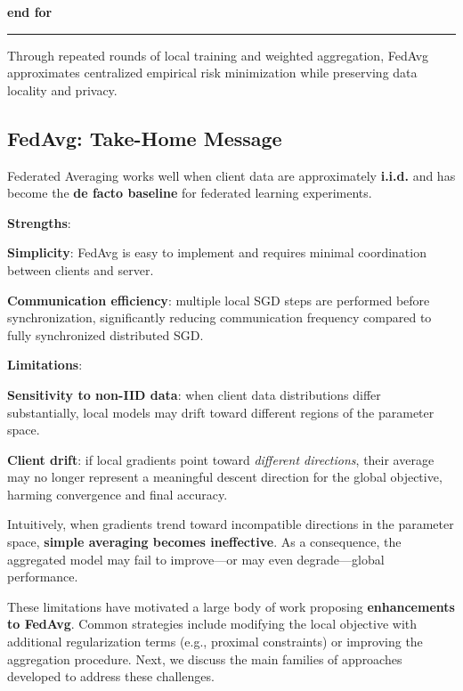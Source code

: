 \noindent\textbf{end for}

\noindent\rule{\textwidth}{0.8pt}

\vspace{0.3cm}

Through repeated rounds of local training and weighted aggregation, FedAvg approximates
centralized empirical risk minimization while preserving data locality and privacy.

\subsection{FedAvg: Take-Home Message}

Federated Averaging works well when client data are approximately \textbf{i.i.d.} and has
become the \textbf{de facto baseline} for federated learning experiments.

\textbf{Strengths}:
\begin{compactitemize}
    \item \textbf{Simplicity}: FedAvg is easy to implement and requires minimal coordination
    between clients and server.
    \item \textbf{Communication efficiency}: multiple local SGD steps are performed before
    synchronization, significantly reducing communication frequency compared to fully
    synchronized distributed SGD.
\end{compactitemize}

\textbf{Limitations}:
\begin{compactitemize}
    \item \textbf{Sensitivity to non-IID data}: when client data distributions differ
    substantially, local models may drift toward different regions of the parameter space.
    \item \textbf{Client drift}: if local gradients point toward \emph{different directions},
    their average may no longer represent a meaningful descent direction for the global
    objective, harming convergence and final accuracy.
\end{compactitemize}

Intuitively, when gradients trend toward incompatible directions in the parameter space,
\textbf{simple averaging becomes ineffective}. As a consequence, the aggregated model may
fail to improve—or may even degrade—global performance.

These limitations have motivated a large body of work proposing \textbf{enhancements to
FedAvg}. Common strategies include modifying the local objective with additional
regularization terms (e.g., proximal constraints) or improving the aggregation procedure.
Next, we discuss the main families of approaches developed to address these challenges.

